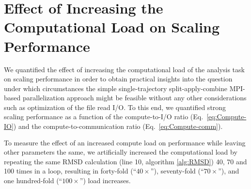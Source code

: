 
\section{Effect of Increasing the Computational Load on Scaling
  Performance}
\label{sec:shiftload}

We quantified the effect of increasing the computational load of the analysis task on scaling performance in order to obtain practical insights into the question under which circumstances the simple single-trajectory split-apply-combine MPI-based parallelization approach might be feasible without any other considerations such as optimization of the file read I/O.
To this end, we quantified strong scaling performance as a function of the compute-to-I/O ratio \RcompIO (Eq.~\ref{eq:Compute-IO}) and the compute-to-communication ratio \Rcompcomm (Eq.~\ref{eq:Compute-comm}).

To measure the effect of an increased compute load on performance while leaving other parameters the same, we artificially increased the computational load by repeating the same RMSD calculation (line 10, algorithm \ref{alg:RMSD}) 40, 70 and 100 times in a loop, resulting in forty-fold (``$40\times$''), seventy-fold (``$70\times$''), and one hundred-fold (``$100\times$'') load increases.





